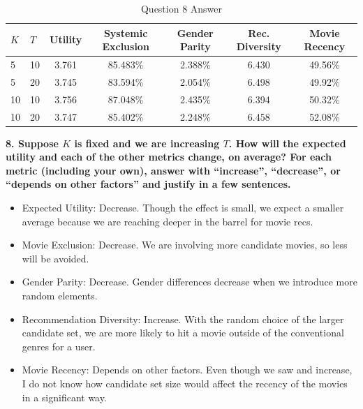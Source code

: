 \documentclass{article}
\begin{document}
\begin{table}[h]
    \centering
    \caption{Question 8 Answer}
    \begin{tabular}{ll|ccccc}
        \toprule
        \textbf{$K$} & \textbf{$T$} & \textbf{Utility} & \textbf{Systemic Exclusion} & \textbf{Gender Parity} & \textbf{Rec. Diversity} & \textbf{Movie Recency} \\
        \midrule
        5 & 10 & 3.761 & 85.483\% & 2.388\% & 6.430 & 49.56\% \\
        5 & 20 & 3.745 & 83.594\% & 2.054\% & 6.498 & 49.92\% \\
        10 & 10 & 3.756 & 87.048\% & 2.435\% & 6.394 & 50.32\% \\
        10 & 20 & 3.747 & 85.402\% & 2.248\% & 6.458 & 52.08\% \\
        \bottomrule
    \end{tabular}
    \label{tab:movie_ratings}
\end{table}

\bigskip

\textbf{8. Suppose $K$ is fixed and we are increasing $T$. How will the expected utility and each of the other metrics change, on average? For each metric (including your own), answer with ``increase'', ``decrease'', or ``depends on other factors'' and justify in a few sentences.}
\bigskip
\begin{mdframed}
\begin{itemize}
    \item Expected Utility: Decrease. Though the effect is small, we expect a smaller average because we are reaching deeper in the barrel for movie recs.
    \item Movie Exclusion: Decrease. We are involving more candidate movies, so less will be avoided.
    \item Gender Parity: Decrease. Gender differences decrease when we introduce more random elements.
    \item Recommendation Diversity: Increase. With the random choice of the larger candidate set, we are more likely to hit a movie outside of the conventional genres for a user.
    \item Movie Recency: Depends on other factors. Even though we saw and increase, I do not know how candidate set size would affect the recency of the movies in a significant way. 
\end{itemize}
\end{mdframed}
\bigskip
\end{document}
